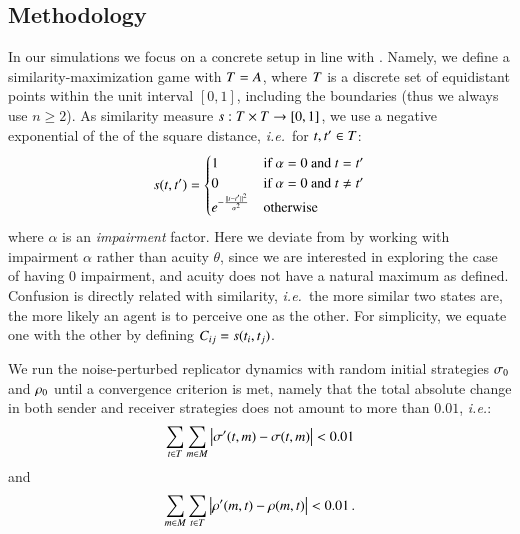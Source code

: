 \subsection{Methodology}
\newcommand{\impairment}{\alpha}
In our simulations we focus on a concrete setup in line with \cite{Correia2013}.
Namely, we define a similarity-maximization game with $T = A$, where $T$ is a discrete set of equidistant points within the unit interval $[0,1]$, including the boundaries (thus we always use $n \geq 2$).
As similarity measure $s:T \times T \rightarrow [0,1]$, we use a negative exponential of the of the square distance, \emph{i.e.}~for $t,t^\prime \in T$:
\begin{align*}
  s(\state,\state^\prime) =
    \begin{cases}
    1 & \textrm{if } \impairment = 0 \textrm{ and } \state = \state^\prime \\
    0 & \textrm{if } \impairment = 0 \textrm{ and } \state \neq \state^\prime \\
    e^{-\frac{\lVert \state - \state^\prime \rVert ^2}{\impairment^2}} & \textrm{otherwise} \\
    \end{cases}
\end{align*}
where $\impairment$ is an \emph{impairment} factor.
Here we deviate from \cite{Correia2013} by working with impairment $\impairment$ rather than acuity $\theta$, since we are interested in exploring the case of having $0$ impairment, and acuity does not have a natural maximum as defined.
Confusion is directly related with similarity, \emph{i.e.}~the more similar two states are, the more likely an agent is to perceive one as the other.
For simplicity, we equate one with the other by defining $C_{ij} = s(t_i,t_j)$.

We run the noise-perturbed replicator dynamics with random initial strategies $\sigma_0$ and $\rho_0$ until a convergence criterion is met, namely that the total absolute change in both sender and receiver strategies does not amount to more than $0.01$, \emph{i.e.}:
\begin{align*}
  \sum_{t \in T} \sum_{m \in M} \left| \sigma^\prime(t,m) - \sigma(t,m) \right| < 0.01
\end{align*}
and
\begin{align*}
  \sum_{m \in M} \sum_{t \in T} \left| \rho^\prime(m,t) - \rho(m,t) \right| < 0.01 \,.
\end{align*}

